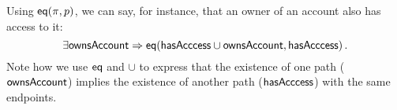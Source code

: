 

\begin{example}\label{ex:fancy-shacl-eq}
  Using $\mathsf{eq}(\pi, p)$, we can say, for instance, that an owner of an
  account also has access to it:
  \[
    \exists \mathsf{ownsAccount} \Rightarrow  \mathsf{eq}(\mathsf{hasAcccess} \cup \mathsf{ownsAccount}, \mathsf{hasAcccess})\,.
  \]
  Note how we use $\mathsf{eq}$ and $\cup$ to express that the existence of one path
  ($\mathsf{ownsAccount}$) implies the existence of another path ($\mathsf{hasAcccess}$) with the same
  endpoints.
\end{example}

